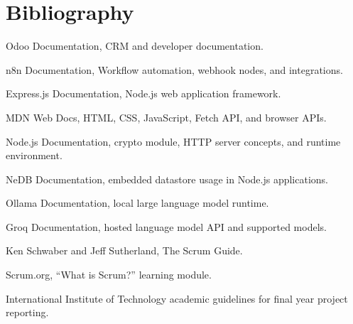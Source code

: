 \documentclass[12pt,a4paper,oneside]{report}
\begin{document}
\chapter*{Bibliography}
\begin{enumerate}[label={\textup{[\arabic*]}}, leftmargin=1.2cm]
\item Odoo Documentation, CRM and developer documentation.
\item n8n Documentation, Workflow automation, webhook nodes, and integrations.
\item Express.js Documentation, Node.js web application framework.
\item MDN Web Docs, HTML, CSS, JavaScript, Fetch API, and browser APIs.
\item Node.js Documentation, crypto module, HTTP server concepts, and runtime environment.
\item NeDB Documentation, embedded datastore usage in Node.js applications.
\item Ollama Documentation, local large language model runtime.
\item Groq Documentation, hosted language model API and supported models.
\item Ken Schwaber and Jeff Sutherland, The Scrum Guide.
\item Scrum.org, ``What is Scrum?'' learning module.
\item International Institute of Technology academic guidelines for final year project reporting.
\end{enumerate}

\clearpage
\end{document}
